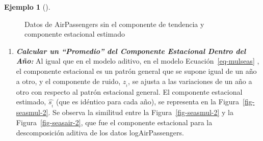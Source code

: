 \documentclass[
  us-letterpaper,
]{scrreprt}
\theoremstyle{definition}
\newtheorem{example}{Ejemplo}[chapter]
\theoremstyle{plain}
\theoremstyle{plain}
\theoremstyle{definition}
\theoremstyle{remark}
\begin{document}
\begin{example}[]
\begin{tcolorbox}
\begin{figure}[H]
\begin{minipage}{0.50\linewidth}
{}


\end{minipage}%
%
\begin{minipage}{0.50\linewidth}



\end{minipage}%

\caption{\label{fig-seasmul}Datos de AirPassengers sin el componente de
tendencia y componente estacional estimado}

\end{figure}%

\begin{enumerate}
\def\labelenumi{\alph{enumi}.}
\setcounter{enumi}{2}
\item
  \textbf{\emph{Calcular un ``Promedio'' del Componente Estacional
  Dentro del Año:}} Al igual que en el modelo aditivo, en el modelo
  Ecuación~\ref{eq-mulseas} , el componente estacional es un patrón
  general que se supone igual de un año a otro, y el componente de
  ruido, \(z_{_t}\), se ajusta a las variaciones de un año a otro con
  respecto al patrón estacional general. El componente estacional
  estimado, \(\hat{s_{_t}}\) (que es idéntico para cada año), se
  representa en la Figura~\ref{fig-seasmul-2}. Se observa la similitud
  entre la Figura~\ref{fig-seasmul-2} y la Figura~\ref{fig-seasair-2},
  que fue el componente estacional para la descomposición aditiva de los
  datos logAirPassengers.


\end{enumerate}
\end{tcolorbox}
\end{example}
\end{document}
